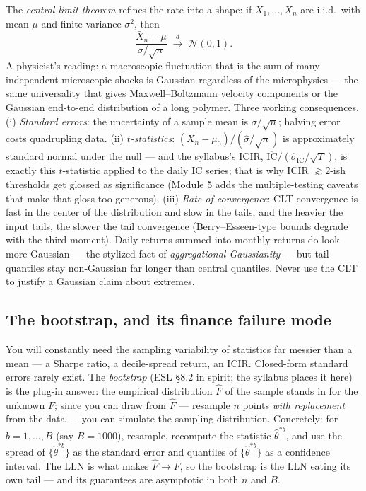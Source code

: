 \documentclass[11pt]{article}
\numberwithin{equation}{section}
\theoremstyle{plain}
\theoremstyle{definition}
\theoremstyle{remark}
\newcommand{\Normal}{\mathcal{N}}
\begin{document}
The \emph{central limit theorem} refines the rate into a shape: if $X_1, \dots, X_n$ are i.i.d.\ with mean $\mu$ and finite variance $\sigma^2$, then
\begin{equation}
\frac{\bar X_n - \mu}{\sigma / \sqrt{n}} \;\xrightarrow{\;d\;}\; \Normal(0, 1).
\end{equation}
A physicist's reading: a macroscopic fluctuation that is the sum of many independent microscopic shocks is Gaussian regardless of the microphysics --- the same universality that gives Maxwell--Boltzmann velocity components or the Gaussian end-to-end distribution of a long polymer. Three working consequences. (i) \emph{Standard errors}: the uncertainty of a sample mean is $\sigma/\sqrt{n}$; halving error costs quadrupling data. (ii) \emph{$t$-statistics}: $(\bar X_n - \mu_0)/(\hat\sigma/\sqrt{n})$ is approximately standard normal under the null --- and the syllabus's ICIR, $\overline{\mathrm{IC}} \big/ (\hat\sigma_{\mathrm{IC}} / \sqrt{T})$, is exactly this $t$-statistic applied to the daily IC series; that is why ICIR $\gtrsim 2$-ish thresholds get glossed as significance (Module 5 adds the multiple-testing caveats that make that gloss too generous). (iii) \emph{Rate of convergence}: CLT convergence is fast in the center of the distribution and slow in the tails, and the heavier the input tails, the slower the tail convergence (Berry--Esseen-type bounds degrade with the third moment). Daily returns summed into monthly returns do look more Gaussian --- the stylized fact of \emph{aggregational Gaussianity} --- but tail quantiles stay non-Gaussian far longer than central quantiles. Never use the CLT to justify a Gaussian claim about extremes.

\subsection{The bootstrap, and its finance failure mode}\label{sec:bootstrap}

You will constantly need the sampling variability of statistics far messier than a mean --- a Sharpe ratio, a decile-spread return, an ICIR. Closed-form standard errors rarely exist. The \emph{bootstrap} (ESL \S8.2 in spirit; the syllabus places it here) is the plug-in answer: the empirical distribution $\hat{F}$ of the sample stands in for the unknown $F$; since you can draw from $\hat F$ --- resample $n$ points \emph{with replacement} from the data --- you can simulate the sampling distribution. Concretely: for $b = 1, \dots, B$ (say $B = 1000$), resample, recompute the statistic $\hat\theta^{*b}$, and use the spread of $\{\hat\theta^{*b}\}$ as the standard error and quantiles of $\{\hat\theta^{*b}\}$ as a confidence interval. The LLN is what makes $\hat F \to F$, so the bootstrap is the LLN eating its own tail --- and its guarantees are asymptotic in both $n$ and $B$.
\end{document}
